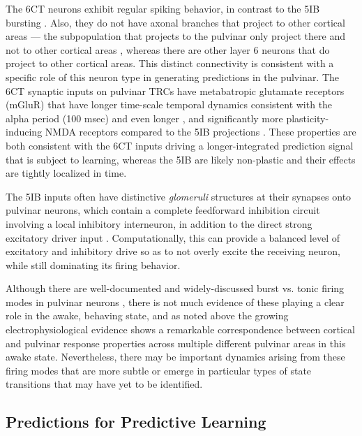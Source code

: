 \documentclass[11pt,twoside]{article}
\newif\myifpdf
\begin{document}
The 6CT neurons exhibit regular spiking behavior, in contrast to the 5IB bursting \cite{Thomson10,ThomsonLamy07}. Also, they do not have axonal branches that project to other cortical areas --- the subpopulation that projects to the pulvinar only project there and not to other cortical areas \cite{PetrofViaeneSherman12}, whereas there are other layer 6 neurons that do project to other cortical areas.  This distinct connectivity is consistent with a specific role of this neuron type in generating predictions in the pulvinar.   The 6CT synaptic inputs on pulvinar TRCs have metabatropic glutamate receptors (mGluR) that have longer time-scale temporal dynamics consistent with the alpha period (100 msec) and even longer \cite{Sherman14}, and significantly more plasticity-inducing NMDA receptors compared to the 5IB projections \cite{UsreySherman18}.  These properties are both consistent with the 6CT inputs driving a longer-integrated prediction signal that is subject to learning, whereas the 5IB are likely non-plastic and their effects are tightly localized in time. 

The 5IB inputs often have distinctive \emph{glomeruli} structures at their synapses onto pulvinar neurons, which contain a complete feedforward inhibition circuit involving a local inhibitory interneuron, in addition to the direct strong excitatory driver input \cite{WilsonBoseShermanEtAl84}.  Computationally, this can provide a balanced level of excitatory and inhibitory drive so as to not overly excite the receiving neuron, while still dominating its firing behavior.

Although there are well-documented and widely-discussed burst vs. tonic firing modes in pulvinar neurons \cite{ShermanGuillery06}, there is not much evidence of these playing a clear role in the awake, behaving state, and as noted above the growing electrophysiological evidence shows a remarkable correspondence between cortical and pulvinar response properties across multiple different pulvinar areas in this awake state.  Nevertheless, there may be important dynamics arising from these firing modes that are more subtle or emerge in particular types of state transitions that may have yet to be identified.

\subsection{Predictions for Predictive Learning}
\end{document}
